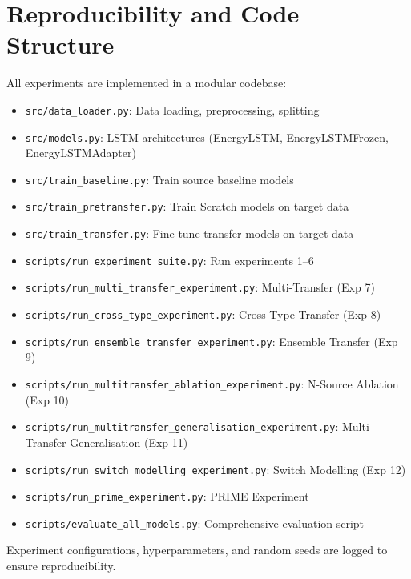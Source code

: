 \documentclass[12pt,a4paper]{report}
\begin{document}
\section{Reproducibility and Code Structure}

All experiments are implemented in a modular codebase:

\begin{itemize}
    \item \texttt{src/data\_loader.py}: Data loading, preprocessing, splitting
    \item \texttt{src/models.py}: LSTM architectures (EnergyLSTM, EnergyLSTMFrozen, EnergyLSTMAdapter)
    \item \texttt{src/train\_baseline.py}: Train source baseline models
    \item \texttt{src/train\_pretransfer.py}: Train Scratch models on target data
    \item \texttt{src/train\_transfer.py}: Fine-tune transfer models on target data
    \item \texttt{scripts/run\_experiment\_suite.py}: Run experiments 1--6
    \item \texttt{scripts/run\_multi\_transfer\_experiment.py}: Multi-Transfer (Exp 7)
    \item \texttt{scripts/run\_cross\_type\_experiment.py}: Cross-Type Transfer (Exp 8)
    \item \texttt{scripts/run\_ensemble\_transfer\_experiment.py}: Ensemble Transfer (Exp 9)
    \item \texttt{scripts/run\_multitransfer\_ablation\_experiment.py}: N-Source Ablation (Exp 10)
    \item \texttt{scripts/run\_multitransfer\_generalisation\_experiment.py}: Multi-Transfer Generalisation (Exp 11)
    \item \texttt{scripts/run\_switch\_modelling\_experiment.py}: Switch Modelling (Exp 12)
    \item \texttt{scripts/run\_prime\_experiment.py}: PRIME Experiment
    \item \texttt{scripts/evaluate\_all\_models.py}: Comprehensive evaluation script
\end{itemize}

Experiment configurations, hyperparameters, and random seeds are logged to ensure reproducibility.

\end{document}
